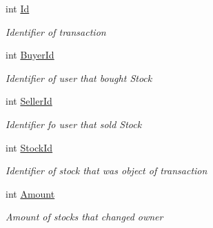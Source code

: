 \begin{DoxyCompactItemize}
\item 
int \mbox{\hyperlink{class_gielda_l2_1_1_i_n_f_r_a_s_t_r_u_c_t_u_r_e_1_1_d_t_o_1_1_transaction_d_t_o_a4810709e82b9bf7020a7635dc7734888}{Id}}
\begin{DoxyCompactList}\small\item\em Identifier of transaction \end{DoxyCompactList}\item 
int \mbox{\hyperlink{class_gielda_l2_1_1_i_n_f_r_a_s_t_r_u_c_t_u_r_e_1_1_d_t_o_1_1_transaction_d_t_o_aa669c093df1698322aa3a11cd112f4bd}{Buyer\+Id}}
\begin{DoxyCompactList}\small\item\em Identifier of user that bought Stock \end{DoxyCompactList}\item 
int \mbox{\hyperlink{class_gielda_l2_1_1_i_n_f_r_a_s_t_r_u_c_t_u_r_e_1_1_d_t_o_1_1_transaction_d_t_o_a3e78d4e85220d4aea48b8cbde2b3b252}{Seller\+Id}}
\begin{DoxyCompactList}\small\item\em Identifier fo user that sold Stock \end{DoxyCompactList}\item 
int \mbox{\hyperlink{class_gielda_l2_1_1_i_n_f_r_a_s_t_r_u_c_t_u_r_e_1_1_d_t_o_1_1_transaction_d_t_o_afd6286bcdef2298ae55c153bb61eb048}{Stock\+Id}}
\begin{DoxyCompactList}\small\item\em Identifier of stock that was object of transaction \end{DoxyCompactList}\item 
int \mbox{\hyperlink{class_gielda_l2_1_1_i_n_f_r_a_s_t_r_u_c_t_u_r_e_1_1_d_t_o_1_1_transaction_d_t_o_a917bd495a7c98b78bf69c346d0c3b383}{Amount}}
\begin{DoxyCompactList}\small\item\em Amount of stocks that changed owner \end{DoxyCompactList}\item 

\end{DoxyCompactItemize}

